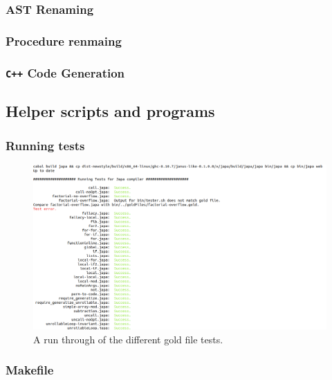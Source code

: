 \subsubsection{AST Renaming}


\subsubsection{Procedure renmaing}


\subsubsection{\texttt{C++} Code Generation}


\subsection{Helper scripts and programs}

\subsubsection{Running tests}

\begin{figure}[H]
    \centering
    \includegraphics[scale=0.5]{imgs/testrun.png}
    \caption{A run through of the different gold file tests.}
    \label{fig:testrun}
\end{figure}

\subsubsection{Makefile}


